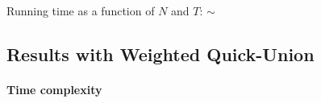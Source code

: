 \documentclass[11pt,a4paper,notitlepage]{article}
\newcommand{\explanation}[1]{}  %
\begin{document}
Running time as a function of $N$ and $T$:  $\sim$ 

\explanation{Explain briefly how you come up this running time}

\subsection{Results with Weighted Quick-Union}
\explanation{Repeat the previous question, but use WeightedQuickUnionUF.java.}

\begin{table}[htbp]
  \centering
  \caption{Caption for both}
\qquad \qquad
\end{table}



\paragraph{Time complexity}
\explanation{
Give a formula (using tilde notation) for the running time (in seconds) of 
\texttt{PercolationStats.java} as a function of both $N$ and $T$. Be sure to give both 
the coefficient and exponent of the leading term. Your coefficients should 
be based on empirical data and rounded to two significant digits, such as 
$5.3*10^{-8} \cdot N^5.0 T^{1.5}$.}
\end{document}
